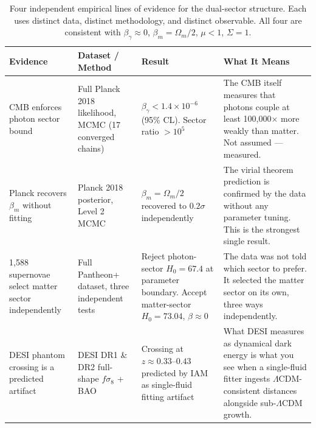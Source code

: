 \documentclass[12pt]{article}
\begin{document}
\vspace{8pt}

\begin{table}[htbp]
\centering
\small
\renewcommand{\arraystretch}{1.3}
\begin{tabular}{p{2.8cm} p{3.0cm} p{3.0cm} p{3.0cm}}
\toprule
\textbf{Evidence} & \textbf{Dataset / Method} & \textbf{Result} &
\textbf{What It Means} \\
\midrule

CMB enforces photon sector bound &
Full Planck 2018 likelihood, MCMC (17 converged chains) &
$\beta_\gamma < 1.4\times10^{-6}$ (95\% CL). Sector ratio $> 10^5$ &
The CMB itself measures that photons couple at least 100,000$\times$ more weakly than matter. Not assumed --- measured. \\

\midrule

Planck recovers $\beta_m$ without fitting &
Planck 2018 posterior, Level 2 MCMC &
$\beta_m = \Omega_m/2$ recovered to $0.2\sigma$ independently &
The virial theorem prediction is confirmed by the data without any parameter tuning. This is the strongest single result. \\

\midrule

1,588 supernovae select matter sector independently &
Full Pantheon+ dataset, three independent tests &
Reject photon-sector $H_0 = 67.4$ at parameter boundary. Accept matter-sector $H_0 = 73.04$, $\beta\approx 0$ &
The data was not told which sector to prefer. It selected the matter sector on its own, three ways independently. \\

\midrule

DESI phantom crossing is a predicted artifact &
DESI DR1 \& DR2 full-shape $f\sigma_8$ + BAO &
Crossing at $z \approx 0.33$--$0.43$ predicted by IAM as single-fluid fitting artifact &
What DESI measures as dynamical dark energy is what you see when a single-fluid fitter ingests $\Lambda$CDM-consistent distances alongside sub-$\Lambda$CDM growth. \\

\bottomrule
\end{tabular}
\caption{Four independent empirical lines of evidence for the dual-sector
structure. Each uses distinct data, distinct methodology, and distinct
observable. All four are consistent with $\beta_\gamma \approx 0$,
$\beta_m = \Omega_m/2$, $\mu < 1$, $\Sigma = 1$.}
\label{tab:evidence}
\end{table}
\end{document}
